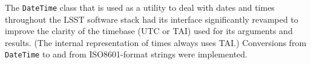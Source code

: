 The {\tt DateTime} class that is used as a utility to deal with dates and
times throughout the LSST software stack had its interface significantly
revamped to improve the clarity of the timebase (UTC or TAI) used for
its arguments and results.  (The internal representation of times always
uses TAI.)  Conversions from {\tt DateTime} to and from ISO8601-format
strings were implemented.

